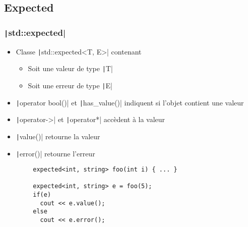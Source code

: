 \documentclass[C++.tex]{subfiles}
\begin{document}
\subsection*{Expected}
\begin{frame}[fragile]
	\frametitle{\texttt|std::expected|}
	\begin{itemize}
		\item Classe \texttt|std::expected<T, E>| contenant
		\begin{itemize}
			\item Soit une valeur de type \texttt|T|
			\item Soit une erreur de type \texttt|E|
		\end{itemize}
		\item \texttt|operator bool()| et \texttt|has_value()| indiquent si l'objet contient une valeur
		\item \texttt|operator->| et \texttt|operator*| accèdent à la valeur 
		\item \texttt|value()| retourne la valeur
		\item \texttt|error()| retourne l'erreur
	\end{itemize}

	\begin{verbatim}
		expected<int, string> foo(int i) { ... }

		expected<int, string> e = foo(5);
		if(e)
		  cout << e.value();
		else
		  cout << e.error();
	\end{verbatim}


\end{frame}
\end{document}
